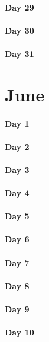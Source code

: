 \documentclass[UTF8,a4paper,8pt]{ctexart}
\begin{document}
 	 \paragraph{Day 29      \quad     }   
 	 \paragraph{Day 30      \quad     }
 	 \paragraph{Day 31      \quad     }
\section{June}
 	 \paragraph{Day 1       \quad     }
 	 \paragraph{Day 2       \quad     }
 	 \paragraph{Day 3       \quad     }
 	 \paragraph{Day 4       \quad     }
 	 \paragraph{Day 5       \quad     }
 	 \paragraph{Day 6       \quad     }
 	 \paragraph{Day 7       \quad     }
 	 \paragraph{Day 8       \quad     }
 	 \paragraph{Day 9       \quad     }
 	 \paragraph{Day 10      \quad     }
\end{document}
